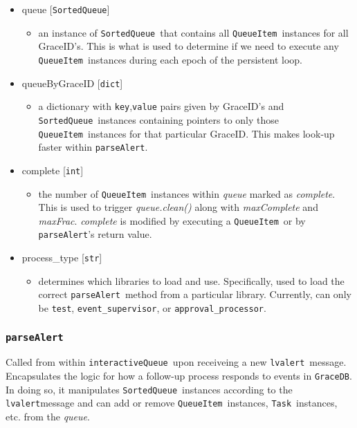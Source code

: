 \documentclass{article}
\newcommand{\GraceDB}{\texttt{GraceDB}}
\newcommand{\alert}{\texttt{lvalert}}
\newcommand{\interactiveQueue}{\texttt{interactiveQueue}}
\newcommand{\parseAlert}{\texttt{parseAlert}}
\newcommand{\SortedQueue}{\texttt{SortedQueue}}
\newcommand{\QueueItem}{\texttt{QueueItem}}
\newcommand{\Task}{\texttt{Task}}
\newcommand{\approvalProcessor}{\texttt{approval\_processor}}
\newcommand{\eventSupervisor}{\texttt{event\_supervisor}}
\newcommand{\pythonint}{\texttt{int}}
\newcommand{\pythonstr}{\texttt{str}}
\newcommand{\pythondict}{\texttt{dict}}
\begin{document}
\begin{itemize}
    \item{queue [\SortedQueue]
        \begin{itemize}
            \item{an instance of \SortedQueue~that contains all \QueueItem~instances for all GraceID's. This is what is used to determine if we need to execute any \QueueItem~instances during each epoch of the persistent loop.}
        \end{itemize}
         }
    \item{queueByGraceID [\pythondict]
        \begin{itemize}
            \item{a dictionary with \texttt{key},\texttt{value} pairs given by GraceID's and \SortedQueue~instances containing pointers to only those \QueueItem~instances for that particular GraceID. This makes look-up faster within \parseAlert.}
        \end{itemize}
         }
    \item{complete [\pythonint]
        \begin{itemize}
            \item{the number of \QueueItem~instances within \textit{queue} marked as \textit{complete}. This is used to trigger \textit{queue.clean()} along with \textit{maxComplete} and \textit{maxFrac}. \textit{complete} is modified by executing a \QueueItem~or by \parseAlert's return value.}
        \end{itemize}
         }
    \item{process\_type [\pythonstr]
        \begin{itemize}
            \item{determines which libraries to load and use. Specifically, used to load the correct \parseAlert~method from a particular library. Currently, can only be \texttt{test}, \eventSupervisor, or \approvalProcessor.}
        \end{itemize}
         }
\end{itemize}


\subsubsection{\parseAlert}
\label{sec: parseAlert}

Called from within \interactiveQueue~upon receiveing a new \alert~message.
Encapsulates the logic for how a follow-up process responds to events in \GraceDB.
In doing so, it manipulates \SortedQueue~instances according to the \alert message and can add or remove \QueueItem~instances, \Task~instances, etc. from the \textit{queue}.
\end{document}
